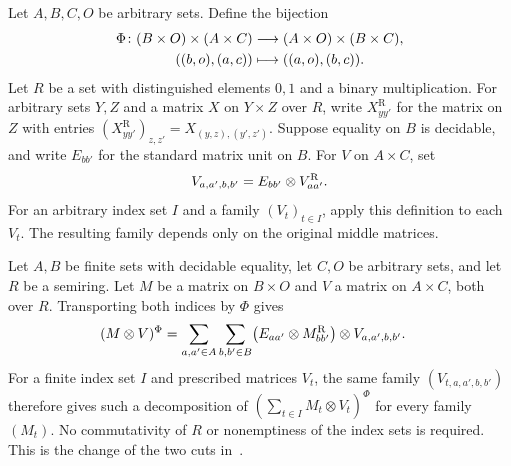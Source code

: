 \begin{definition}
    \label{def:chain_middle_factor_exchange}
    \leanok
    Let $A,B,C,O$ be arbitrary sets. Define the bijection
    \begin{align}
        \Phi\colon (B\times O)\times(A\times C)
                      & \longrightarrow(A\times O)\times(B\times C),\notag \\
        ((b,o),(a,c)) & \longmapsto((a,o),(b,c)).\notag
    \end{align}
    Let $R$ be a set with distinguished elements $0,1$ and a binary
    multiplication. For arbitrary sets $Y,Z$ and a matrix $X$ on $Y\times Z$
    over $R$, write $X^{\mathrm R}_{yy'}$ for the matrix on $Z$ with entries
    $(X^{\mathrm R}_{yy'})_{z,z'}=X_{(y,z),(y',z')}$.
    Suppose equality on $B$ is decidable, and write $E_{bb'}$ for the
    standard matrix unit on $B$. For $V$ on $A\times C$, set
    \begin{align}
        V_{a,a',b,b'}=E_{bb'}\otimes V^{\mathrm R}_{aa'}.\notag
    \end{align}
    For an arbitrary index set $I$ and a family $(V_t)_{t\in I}$, apply
    this definition to each $V_t$.
    The resulting family depends only on the original middle matrices.
\end{definition}

\begin{lemma}
    \label{thm:chain_middle_factor_exchange}
    \leanok
    Let $A,B$ be finite sets with decidable equality, let $C,O$ be arbitrary
    sets, and let $R$ be a semiring. Let $M$ be a matrix on $B\times O$ and $V$
    a matrix on $A\times C$, both over $R$. Transporting both indices by $\Phi$ gives
    \begin{align}
        (M\otimes V)^\Phi
         & =\sum_{a,a'\in A}\sum_{b,b'\in B}
        \bigl(E_{aa'}\otimes M^{\mathrm R}_{bb'}\bigr)\otimes V_{a,a',b,b'}.\notag
    \end{align}
    For a finite index set $I$ and prescribed matrices $V_t$, the same
    family $(V_{t,a,a',b,b'})$ therefore gives such a decomposition of
    $(\sum_{t\in I}M_t\otimes V_t)^\Phi$ for every family $(M_t)$.
    No commutativity of $R$ or nonemptiness of the index sets is required.
    This is the change of the two cuts in~\cite[Proposition~5.7]{Arad2016RigorousRG}.
\end{lemma}

